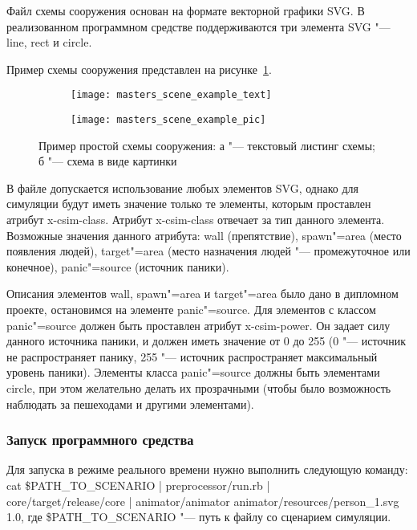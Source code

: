 Файл схемы сооружения основан на формате векторной графики SVG.
В реализованном программном средстве поддерживаются три элемента SVG "--- line, rect и circle.

Пример схемы сооружения представлен на рисунке~\ref{sec:manual:input:building_scheme:svg_listing}.

\begin{figure}[!ht]
  \centering
  \begin{subfigure}[!htb]{0.45\textwidth}
    \centering
    \texttt{[image: masters\_scene\_example\_text]}
    \caption{}
  \end{subfigure}
  \begin{subfigure}[!htb]{0.45\textwidth}
    \centering
    \texttt{[image: masters\_scene\_example\_pic]}
    \caption{}
  \end{subfigure}
  \caption{Пример простой схемы сооружения: а "--- текстовый листинг схемы;
           б "--- схема в виде картинки}
  \label{sec:manual:input:building_scheme:svg_listing}
\end{figure}

В файле допускается использование любых элементов SVG, однако для симуляции будут иметь значение только те элементы, которым проставлен атрибут x-csim-class.
Атрибут x-csim-class отвечает за тип данного элемента.  Возможные значения данного атрибута:
  wall (препятствие),
  spawn"=area (место появления людей),
  target"=area (место назначения людей "--- промежуточное или конечное),
  panic"=source (источник паники).

Описания элементов wall, spawn"=area и target"=area было дано в дипломном проекте, остановимся на элементе panic"=source.
Для элементов с классом panic"=source должен быть проставлен атрибут x-csim-power.
Он задает силу данного источника паники, и должен иметь значение от 0 до 255
(0 "--- источник не распространяет панику, 255 "--- источник распространяет максимальный уровень паники).
Элементы класса panic"=source должны быть элементами circle, при этом желательно делать их прозрачными
(чтобы было возможность наблюдать за пешеходами и другими элементами).

\subsubsection{Запуск программного средства}
\label{sec:manual:launch}

Для запуска в режиме реального времени нужно выполнить следующую команду:
cat \$PATH\_TO\_SCENARIO \-|\- preprocessor/run.rb \-|\- \\ core/target/release/core \-|\- animator/animator animator/resources/person\_1.svg 1.0,
где \$PATH\_TO\_SCENARIO "--- путь к файлу со сценарием симуляции.
